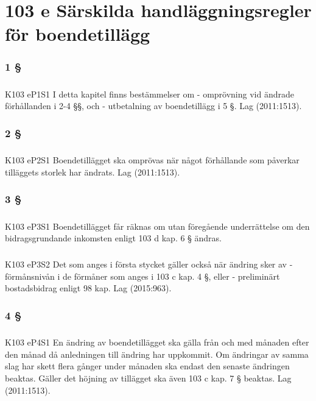 \documentclass[a4paper,notitlepage,openany,10pt]{book}
\begin{document}
\chapter*{103 e Särskilda handläggningsregler för boendetillägg}
\subsection*{1 §}
\paragraph*{}
{\tiny K103 eP1S1}
I detta kapitel finns bestämmelser om
\newline - omprövning vid ändrade förhållanden i 2-4 §§, och
\newline - utbetalning av boendetillägg i 5 §.
Lag (2011:1513).
\subsection*{2 §}
\paragraph*{}
{\tiny K103 eP2S1}
Boendetillägget ska omprövas när något förhållande som påverkar tilläggets storlek har ändrats.
Lag (2011:1513).
\subsection*{3 §}
\paragraph*{}
{\tiny K103 eP3S1}
Boendetillägget får räknas om utan föregående underrättelse om den bidragsgrundande inkomsten enligt 103 d kap. 6 § ändras.
\paragraph*{}
{\tiny K103 eP3S2}
Det som anges i första stycket gäller också när ändring sker av
\newline - förmånsnivån i de förmåner som anges i 103 c kap. 4 §, eller
\newline - preliminärt bostadsbidrag enligt 98 kap.
Lag (2015:963).
\subsection*{4 §}
\paragraph*{}
{\tiny K103 eP4S1}
En ändring av boendetillägget ska gälla från och med månaden efter den månad då anledningen till ändring har uppkommit. Om ändringar av samma slag har skett flera gånger under månaden ska endast den senaste ändringen beaktas. Gäller det höjning av tillägget ska även 103 c kap. 7 § beaktas.
Lag (2011:1513).
\end{document}
